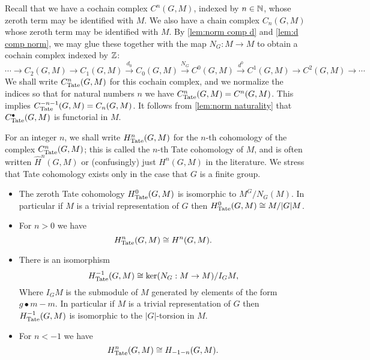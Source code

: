 \begin{definition} \label{def:Tate cohomology}
	\leanok
	Recall that we have a cochain complex $C^n(G,M)$, indexed by $n \in {\mathbb N}$,
	whose zeroth term may be identified with $M$.
	We also have a chain complex $C_n(G,M)$ whose zeroth term may be identified with $M$.
	By \ref{lem:norm comp d} and \ref{lem:d comp norm}, we may glue these
	together with the map $N_G : M \to M$ to obtain	a cochain complex indexed by ${\mathbb Z}$:
	\[
		\cdots \to C_2(G,M) \to C_1(G,M) \stackrel{d_0}\to C_0(G,M)
		\stackrel{N_G}\to C^0(G,M) \stackrel{d^0}\to C^1(G,M) \to C^2(G,M) \to \cdots
	\]
	We shall write $C^n_{\mathrm{Tate}}(G,M)$ for this cochain complex,
	and we normalize the indices so that for
	natural numbers $n$ we have $C^n_{\mathrm{Tate}}(G,M) = C^n(G,M)$. This implies
	$C^{-n-1}_{\mathrm{Tate}}(G,M) = C_n(G,M)$.
	It follows from \ref{lem:norm naturality}
	that $C^\bullet_{\mathrm{Tate}}(G,M)$ is functorial in $M$.

	For an integer $n$, we shall write $H^n_{\mathrm{Tate}}(G,M)$ for the $n$-th cohomology of the complex
	$C^n_{\mathrm{Tate}}(G,M)$; this is called the $n$-th Tate cohomology of $M$,
	and is often written $\hat H^n(G,M)$ or (confusingly) just $H^n(G,M)$ in the literature.
	We stress that Tate cohomology exists only in the case that $G$ is a finite group.
\end{definition}

\begin{lemma}	\label{lem:Tate cohomology is cohomology or homology}
	\leanok
	\begin{itemize}
		\item
		The zeroth Tate cohomology $H^0_{\mathrm{Tate}}(G,M)$ is isomorphic to $M^G / N_G(M)$.
		In particular if $M$ is a trivial representation of $G$ then
		$H^0_{\mathrm{Tate}}(G,M) \cong M / |G|M$.
		\item
		For $n >0 $ we have
		\[
			H^{n}_{\mathrm{Tate}}(G,M) \cong H^{n} (G,M).
		\]
		\item
		There is an isomorphism
		\[
			H^{-1}_{\mathrm{Tate}}(G,M) \cong \ker (N_G : M \to M ) / I_G M,
		\]
		Where $I_GM$ is the submodule of $M$ generated by elements of the form $g \bullet m - m$.
		In particular if $M$ is a trivial representation of $G$ then
		$H^{-1}_{\mathrm{Tate}}(G,M)$ is isomorphic to the $|G|$-torsion in $M$.
		\item
		For $n < -1$ we have
		\[
			H^{n}_{\mathrm{Tate}}(G,M) \cong H_{-1-n} (G,M).
		\]
	\end{itemize}
\end{lemma}

